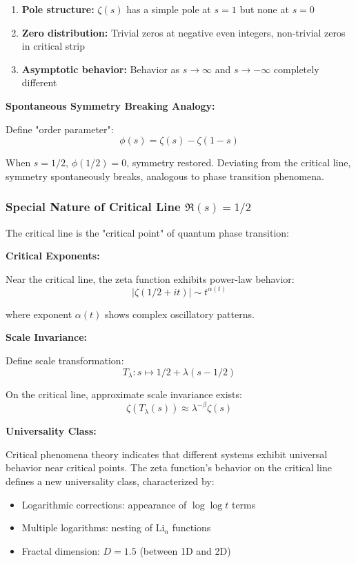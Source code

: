 \documentclass[11pt]{article}
\theoremstyle{plain}
\theoremstyle{definition}
\theoremstyle{remark}
\begin{document}
\begin{enumerate}
\item \textbf{Pole structure:} $\zeta(s)$ has a simple pole at $s=1$ but none at $s=0$
\item \textbf{Zero distribution:} Trivial zeros at negative even integers, non-trivial zeros in critical strip
\item \textbf{Asymptotic behavior:} Behavior as $s \to \infty$ and $s \to -\infty$ completely different
\end{enumerate}

\textbf{Spontaneous Symmetry Breaking Analogy:}

Define "order parameter":
$$\phi(s) = \zeta(s) - \zeta(1-s)$$

When $s = 1/2$, $\phi(1/2) = 0$, symmetry restored. Deviating from the critical line, symmetry spontaneously breaks, analogous to phase transition phenomena.

\subsubsection{Special Nature of Critical Line $\Re(s)=1/2$}

The critical line is the "critical point" of quantum phase transition:

\textbf{Critical Exponents:}

Near the critical line, the zeta function exhibits power-law behavior:
$$|\zeta(1/2 + it)| \sim t^{\alpha(t)}$$

where exponent $\alpha(t)$ shows complex oscillatory patterns.

\textbf{Scale Invariance:}

Define scale transformation:
$$T_\lambda: s \mapsto 1/2 + \lambda(s - 1/2)$$

On the critical line, approximate scale invariance exists:
$$\zeta(T_\lambda(s)) \approx \lambda^{-\beta} \zeta(s)$$

\textbf{Universality Class:}

Critical phenomena theory indicates that different systems exhibit universal behavior near critical points. The zeta function's behavior on the critical line defines a new universality class, characterized by:
\begin{itemize}
\item Logarithmic corrections: appearance of $\log \log t$ terms
\item Multiple logarithms: nesting of $\text{Li}_n$ functions
\item Fractal dimension: $D = 1.5$ (between 1D and 2D)
\end{itemize}
\end{document}
